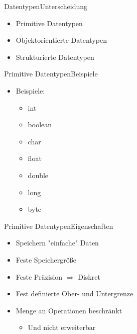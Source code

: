 \begin{frame}{Datentypen}{Unterscheidung}
	\begin{itemize}
		\item Primitive Datentypen
		\item Objektorientierte Datentypen
		\item Strukturierte Datentypen
	\end{itemize}
\end{frame}

\begin{frame}{Primitive Datentypen}{Beispiele}
	\begin{itemize}
	\item Beispiele:
		\begin{itemize}
			\item int
			\item boolean
			\item char
			\item float
			\item double
			\item long
			\item byte
		\end{itemize}
	\end{itemize}
\end{frame}

\begin{frame}{Primitive Datentypen}{Eigenschaften}
	\begin{itemize}
		\item Speichern "einfache" Daten
		\item Feste Speichergröße
		\item Feste Präzision $\Rightarrow$ Diskret
		\item Fest definierte Ober- und Untergrenze
		\item Menge an Operationen beschränkt
		\begin{itemize}
			\item Und nicht erweiterbar
		\end{itemize}
	\end{itemize}
\end{frame}

